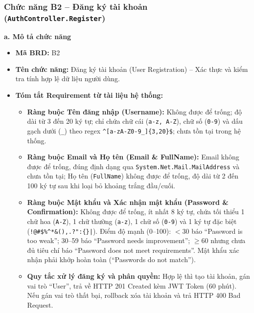 \documentclass[11pt,a4paper]{article}
\begin{document}
\subsubsection{Chức năng B2 -- Đăng ký tài khoản (\texttt{AuthController.Register})}

\noindent\textbf{a. Mô tả chức năng}
\begin{itemize}[leftmargin=1.2cm, noitemsep]
    \item[\textbf{--}] \textbf{Mã BRD:} B2
    \item[\textbf{--}] \textbf{Tên chức năng:} Đăng ký tài khoản (User Registration) -- Xác thực và kiểm tra tính hợp lệ dữ liệu người dùng.
    \item[\textbf{--}] \textbf{Tóm tắt Requirement từ tài liệu hệ thống:}
    \begin{itemize}[leftmargin=0.8cm, label=$\bullet$, noitemsep]
        \item \textbf{Ràng buộc Tên đăng nhập (Username):} Không được để trống; độ dài từ 3 đến 20 ký tự; chỉ chứa chữ cái (\texttt{a-z, A-Z}), chữ số (\texttt{0-9}) và dấu gạch dưới (\texttt{\_}) theo regex \texttt{\^{}[a-zA-Z0-9\_]\{3,20\}\$}; chưa tồn tại trong hệ thống.
        \item \textbf{Ràng buộc Email và Họ tên (Email \& FullName):} Email không được để trống, đúng định dạng qua \texttt{System.Net.Mail.MailAddress} và chưa tồn tại; Họ tên (\texttt{FullName}) không được để trống, độ dài từ 2 đến 100 ký tự sau khi loại bỏ khoảng trắng đầu/cuối.
        \item \textbf{Ràng buộc Mật khẩu và Xác nhận mật khẩu (Password \& Confirmation):} Không được để trống, ít nhất 8 ký tự, chứa tối thiểu 1 chữ hoa (\texttt{A-Z}), 1 chữ thường (\texttt{a-z}), 1 chữ số (\texttt{0-9}) và 1 ký tự đặc biệt (\texttt{!@\#\$\%\^{}*\&(),.?":\{\}|}). Điểm độ mạnh (0--100): $<30$ báo ``Password is too weak''; 30--59 báo ``Password needs improvement''; $\ge 60$ nhưng chưa đủ tiêu chí báo ``Password does not meet requirements''. Mật khẩu xác nhận phải khớp hoàn toàn (``Passwords do not match'').
        \item \textbf{Quy tắc xử lý đăng ký và phân quyền:} Hợp lệ thì tạo tài khoản, gán vai trò ``User'', trả về HTTP 201 Created kèm JWT Token (60 phút). Nếu gán vai trò thất bại, rollback xóa tài khoản và trả HTTP 400 Bad Request.
    \end{itemize}
\end{itemize}
\end{document}
